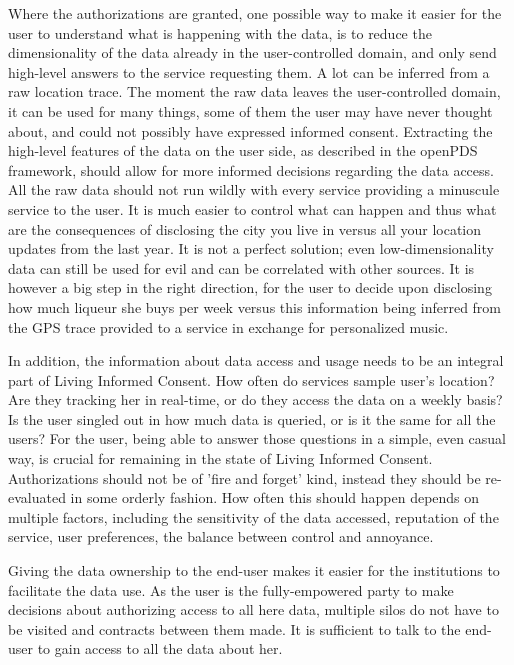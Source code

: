 Where the authorizations are granted, one possible way to make it easier for the user to understand what is happening with the data, is to reduce the dimensionality of the data already in the user-controlled domain, and only send high-level answers to the service requesting them.
A lot can be inferred from a raw location trace.
The moment the raw data leaves the user-controlled domain, it can be used for many things, some of them the user may have never thought about, and could not possibly have expressed informed consent.
Extracting the high-level features of the data on the user side, as described in the openPDS framework, should allow for more informed decisions regarding the data access.
All the raw data should not run wildly with every service providing a minuscule service to the user.
It is much easier to control what can happen and thus what are the consequences of disclosing the city you live in versus all your location updates from the last year.
It is not a perfect solution; even low-dimensionality data can still be used for evil and can be correlated with other sources.
It is however a big step in the right direction, for the user to decide upon disclosing how much liqueur she buys per week versus this information being inferred from the GPS trace provided to a service in exchange for personalized music.

In addition, the information about data access and usage needs to be an integral part of Living Informed Consent.
How often do services sample user's location?
Are they tracking her in real-time, or do they access the data on a weekly basis? 
Is the user singled out in how much data is queried, or is it the same for all the users?
For the user, being able to answer those questions in a simple, even casual way, is crucial for remaining in the state of Living Informed Consent.
Authorizations should not be of 'fire and forget' kind, instead they should be re-evaluated in some orderly fashion.
How often this should happen depends on multiple factors, including the sensitivity of the data accessed, reputation of the service, user preferences, the balance between control and annoyance. 

Giving the data ownership to the end-user makes it easier for the institutions to facilitate the data use.
As the user is the fully-empowered party to make decisions about authorizing access to all here data, multiple silos do not have to be visited and contracts between them made.
It is sufficient to talk to the end-user to gain access to all the data about her. 

